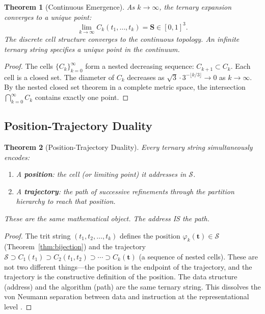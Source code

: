 \documentclass[11pt,a4paper]{article}
\newtheorem{theorem}{Theorem}[section]
\theoremstyle{definition}
\theoremstyle{remark}
\newcommand{\Sspace}{\mathcal{S}}
\begin{document}
\begin{theorem}[Continuous Emergence]
\label{thm:continuous}
As $k \to \infty$, the ternary expansion converges to a unique point:
\begin{equation}
\lim_{k \to \infty} C_k(t_1, \ldots, t_k) = \mathbf{S} \in [0,1]^3.
\label{eq:convergence}
\end{equation}
The discrete cell structure converges to the continuous topology. An infinite ternary string specifies a unique point in the continuum.
\end{theorem}

\begin{proof}
The cells $\{C_k\}_{k=0}^\infty$ form a nested decreasing sequence: $C_{k+1} \subset C_k$. Each cell is a closed set. The diameter of $C_k$ decreases as $\sqrt{3} \cdot 3^{-\lfloor k/3 \rfloor} \to 0$ as $k \to \infty$. By the nested closed set theorem in a complete metric space, the intersection $\bigcap_{k=0}^\infty C_k$ contains exactly one point.
\end{proof}

\subsection{Position-Trajectory Duality}

\begin{theorem}[Position-Trajectory Duality]
\label{thm:duality}
Every ternary string simultaneously encodes:
\begin{enumerate}[nosep]
\item A \textbf{position}: the cell (or limiting point) it addresses in $\Sspace$.
\item A \textbf{trajectory}: the path of successive refinements through the partition hierarchy to reach that position.
\end{enumerate}
These are the same mathematical object. The address IS the path.
\end{theorem}

\begin{proof}
The trit string $(t_1, t_2, \ldots, t_k)$ defines the position $\varphi_k(\mathbf{t}) \in \Sspace$ (Theorem~\ref{thm:bijection}) and the trajectory $\Sspace \supset C_1(t_1) \supset C_2(t_1, t_2) \supset \cdots \supset C_k(\mathbf{t})$ (a sequence of nested cells). These are not two different things---the position is the endpoint of the trajectory, and the trajectory is the constructive definition of the position. The data structure (address) and the algorithm (path) are the same ternary string. This dissolves the von Neumann separation between data and instruction at the representational level \citep{vonneumann1945}.
\end{proof}
\end{document}
